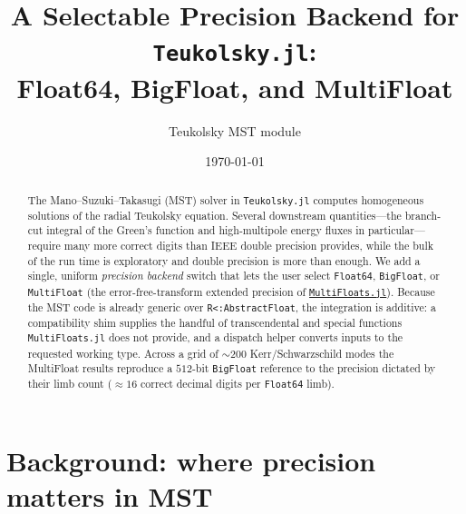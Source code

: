 \documentclass[11pt]{article}
\title{A Selectable Precision Backend for \texttt{Teukolsky.jl}:\\
Float64, BigFloat, and MultiFloat}
\author{Teukolsky MST module}
\date{\today}
\begin{document}
\maketitle

\begin{abstract}
The Mano--Suzuki--Takasugi (MST) solver in \texttt{Teukolsky.jl} computes
homogeneous solutions of the radial Teukolsky equation. Several downstream
quantities---the branch-cut integral of the Green's function and high-multipole
energy fluxes in particular---require many more correct digits than IEEE
double precision provides, while the bulk of the run time is exploratory and
double precision is more than enough. We add a single, uniform \emph{precision
backend} switch that lets the user select \texttt{Float64}, \texttt{BigFloat},
or \texttt{MultiFloat} (the error-free-transform extended precision of
\href{https://github.com/dzhang314/MultiFloats.jl}{\texttt{MultiFloats.jl}}).
Because the MST code is already generic over \texttt{R<:AbstractFloat}, the
integration is additive: a compatibility shim supplies the handful of
transcendental and special functions \texttt{MultiFloats.jl} does not provide,
and a dispatch helper converts inputs to the requested working type. Across a
grid of $\sim 200$ Kerr/Schwarzschild modes the MultiFloat results reproduce a
$512$-bit \texttt{BigFloat} reference to the precision dictated by their limb
count ($\approx 16$ correct decimal digits per \texttt{Float64} limb).
\end{abstract}

\section{Background: where precision matters in MST}
\end{document}

